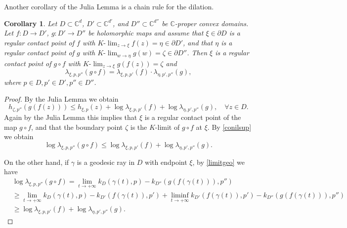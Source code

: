 \documentclass[11pt, reqno]{amsart}
\numberwithin{equation}{section}
\newtheorem{corollary}[theorem]{Corollary}
\theoremstyle{definition}
\newcommand{\C}{\mathbb{C}}
\begin{document}
{{{		
		
		
		
		
		
		
		Another corollary of the Julia Lemma is a chain rule for the dilation.
		\begin{corollary}\label{chainrule}
			Let $D\subset \C^d$,  $D'\subset \C^{d'}$, and $D''\subset \C^{d''}$ be  $\C$-proper convex domains.
			Let $f\colon D\to D'$, $g\colon D'\to D''$ be holomorphic maps and assume that 
			$\xi\in \partial D$ is a regular contact point of $f$ with $K\textrm{-}\lim_{z\to \xi}f(z)=\eta\in \partial D'$, and that
			$\eta$ is a regular contact  point of $g$ with $K\textrm{-}\lim_{w\to \eta}g(w)=\zeta\in \partial D''$. Then $\xi$ is a regular contact point of $g\circ f$ with  $K\textrm{-}\lim_{z\to \xi}g(f(z))=\zeta$ and
			$$\lambda_{\xi,p,p''}(g\circ f)=\lambda_{\xi,p,p'}(f)\cdot\lambda_{\eta,p',p''}(g),$$
			where  $p\in D, p'\in D',p''\in D''$.
		\end{corollary}
		\begin{proof}
			By the Julia Lemma we obtain 
			$$h_{\zeta,p''}(g(f(z)))\leq h_{\xi,p}(z)+\log\lambda_{\xi,p,p'}(f)+\log\lambda_{\eta,p',p''}(g), \quad \forall z\in D.$$
			Again by  the Julia Lemma this implies that $\xi$ is a  regular contact point of the map $g\circ f$,   
			and that the boundary point $\zeta$ is the $K$-limit of $g\circ f$ at $\xi$. By \eqref{conilsup} we obtain
			$$\log\lambda_{\xi,p,p''}(g\circ f)\leq \log\lambda_{\xi,p,p'}(f)+\log\lambda_{\eta,p',p''}(g).$$
			
			On the other hand, if $\gamma$ is a geodesic ray in $D$ with  endpoint $\xi$, by  \eqref{limitgeo} we have
			\begin{align*}
				&\log\lambda_{\xi,p,p''}(g\circ f)=\lim_{t\to+\infty}k_D(\gamma(t),p)-k_{D''}(g(f(\gamma(t))),p'')\\
				&\geq \lim_{t\to+\infty}k_D(\gamma(t),p)-k_{D'}(f(\gamma(t)),p')+\liminf_{t\to +\infty} k_{D' }(f(\gamma(t)),p')-k_{D''}(g(f(\gamma(t))),p'')\\
				&\geq \log\lambda_{\xi,p,p'}(f)+\log\lambda_{\eta,p',p''}(g).
			\end{align*}
		\end{proof}
		
		
		
		
		
		
		
		
		
		
		
		
		
		
		
}}}
\end{document}
